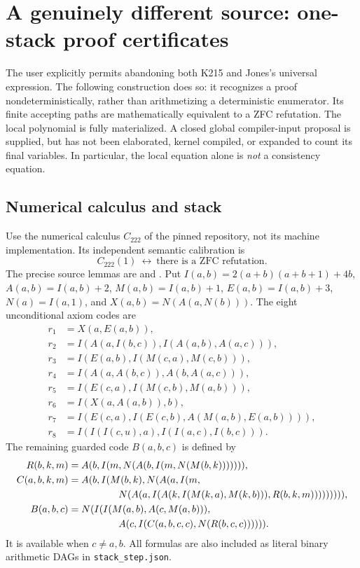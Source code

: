 \section{A genuinely different source: one-stack proof certificates}
\label{sec:onestack}
The user explicitly permits abandoning both K215 and Jones's universal
expression. The following construction does so: it recognizes a proof
nondeterministically, rather than arithmetizing a deterministic enumerator.
Its finite accepting paths are mathematically equivalent to a ZFC refutation.
The local polynomial is fully materialized. A closed global compiler-input
proposal is supplied, but has not been elaborated, kernel compiled, or
expanded to count its final variables. In particular, the local equation
alone is \emph{not} a consistency equation.

\subsection{Numerical calculus and stack}
Use the numerical calculus $C_{222}$ of the pinned repository, not its machine
implementation. Its independent semantic calibration is
\[
 C_{222}(1)\ \longleftrightarrow\ \text{there is a ZFC refutation}.
\]
The precise source lemmas are
 and
.
Put $I(a,b)=2(a+b)(a+b+1)+4b$, $A(a,b)=I(a,b)+2$,
$M(a,b)=I(a,b)+1$, $E(a,b)=I(a,b)+3$, $N(a)=I(a,1)$, and
$X(a,b)=N(A(a,N(b)))$.
The eight unconditional axiom codes are
\begin{align*}
 r_1&=X(a,E(a,b)),\\
 r_2&=I(A(a,I(b,c)),I(A(a,b),A(a,c))),\\
 r_3&=I(E(a,b),I(M(c,a),M(c,b))),\\
 r_4&=I(A(a,A(b,c)),A(b,A(a,c))),\\
 r_5&=I(E(c,a),I(M(c,b),M(a,b))),\\
 r_6&=I(X(a,A(a,b)),b),\\
 r_7&=I(E(c,a),I(E(c,b),A(M(a,b),E(a,b)))),\\
 r_8&=I(I(I(c,u),a),I(I(a,c),I(b,c))).
\end{align*}
The remaining guarded code $B(a,b,c)$ is defined by
\begin{align*}
 R(b,k,m)&=A(b,I(m,N(A(b,I(m,N(M(b,k))))))),\\
 C(a,b,k,m)&=A(b,I(M(b,k),N(A(a,I(m,\\
 &\hspace{18mm}N(A(a,I(A(k,I(M(k,a),M(k,b))),R(b,k,m))))))))),\\
 B(a,b,c)&=N(I(I(M(a,b),A(c,M(a,b))),\\
 &\hspace{18mm}A(c,I(C(a,b,c,c),N(R(b,c,c)))))).
\end{align*}
It is available when $c\ne a,b$. All formulas are also included as literal
binary arithmetic DAGs in \texttt{stack\_step.json}.

